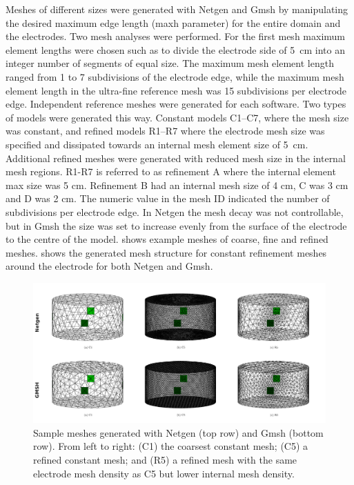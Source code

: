 Meshes of different sizes were generated with Netgen and Gmsh by manipulating the desired
maximum edge length (maxh parameter) for the entire domain and the electrodes.
Two  mesh analyses were performed. For the first
mesh maximum element lengths were
chosen such as to divide the electrode side of 5~cm into an integer number of
segments of equal size. 
The maximum mesh element length ranged from 1 to 7 subdivisions of the electrode 
edge, while the maximum mesh element length in the ultra-fine reference mesh  
was 15 subdivisions per 
electrode edge. Independent reference meshes were generated for each software.
Two types of models were generated this way. Constant models C1--C7, where the mesh size 
was constant, and refined models R1--R7 where the electrode mesh size was specified and 
dissipated towards an internal mesh element size of 5 cm. Additional refined meshes were
generated with reduced mesh size in the internal mesh regions.  
R1-R7 is referred to as refinement A where the internal element max size was 5 cm. Refinement 
B had an internal mesh size of 4 cm, C was 3 cm and D was 2 cm.
The numeric value in the mesh 
ID indicated the number of subdivisions per electrode edge. 
In Netgen the mesh decay was not controllable, but in Gmsh the size was set 
to increase evenly from the surface of the electrode to the centre of the model.
 shows example meshes of coarse, fine and refined
meshes.  shows the generated mesh structure for 
constant refinement meshes around the electrode 
for both Netgen and Gmsh. 


\begin{figure}
   \includegraphics[width=\columnwidth]{chapter4-mesh_refinement/imgs/sample_meshes.pdf}
   \caption[Example meshes for various refinement strategies]{\label{fig:sample_meshes} 
   Sample meshes generated with Netgen (top row)
   and Gmsh (bottom row). From left to right: (C1) the coarsest constant
   mesh; (C5) a refined constant mesh; and (R5) a refined mesh with the same
   electrode mesh density as C5 but lower internal mesh density.}
\end{figure}


